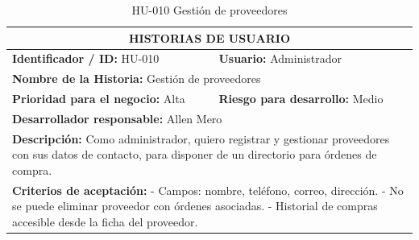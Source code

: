 \documentclass[12pt, letterpaper]{report}
\begin{document}
\begin{table}[H]
\centering
\caption{HU-010 Gestión de proveedores}
\begin{tabularx}{\textwidth}{|X X|}
\hline
\multicolumn{2}{|c|}{\textbf{HISTORIAS DE USUARIO}} \\ \hline
\textbf{Identificador / ID:} HU-010 & \textbf{Usuario:} Administrador \\ \hline
\multicolumn{2}{|l|}{\textbf{Nombre de la Historia:} Gestión de proveedores} \\ \hline
\textbf{Prioridad para el negocio:} Alta & \textbf{Riesgo para desarrollo:} Medio \\ \hline
\multicolumn{2}{|l|}{\textbf{Desarrollador responsable:} Allen Mero} \\ \hline
\multicolumn{2}{|p{0.95\textwidth}|}{\textbf{Descripción:} Como administrador, quiero registrar y gestionar proveedores con sus datos de contacto, para disponer de un directorio para órdenes de compra.} \\ \hline
\multicolumn{2}{|p{0.95\textwidth}|}{\textbf{Criterios de aceptación:} \newline
- Campos: nombre, teléfono, correo, dirección. \newline
- No se puede eliminar proveedor con órdenes asociadas. \newline
- Historial de compras accesible desde la ficha del proveedor.} \\ \hline
\end{tabularx}
\end{table}
\end{document}

